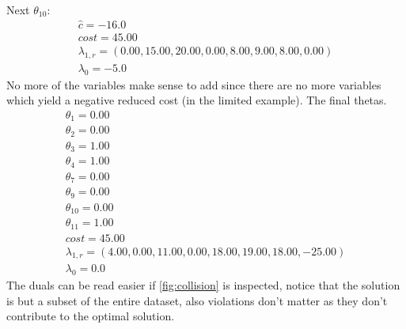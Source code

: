 \documentclass{article}
\begin{document}
    Next $\theta_{10}$:
    \begin{equation*}
        \begin{array}{c}
            \hat{c} = -16.0\\
            cost = 45.00\\
            \lambda_{1,r} = (0.00,15.00,20.00,0.00,8.00,9.00,8.00,0.00)\\
            \lambda_0 = -5.0
        \end{array}
    \end{equation*}
    No more of the variables make sense to add since there are no more variables which yield a negative reduced cost (in the limited example).
    The final thetas.
    \begin{equation*}
        \begin{array}{c}
            \theta_{1} = 0.00\\
            \theta_{2} = 0.00\\
            \theta_{3} = 1.00\\
            \theta_{4} = 1.00\\
            \theta_{7} = 0.00\\
            \theta_{9} = 0.00\\
            \theta_{10} = 0.00\\
            \theta_{11} = 1.00\\
            cost = 45.00\\
            \lambda_{1,r} = (4.00,0.00,11.00,0.00,18.00,19.00,18.00,-25.00)\\
            \lambda_0 = 0.0
        \end{array}
    \end{equation*}
    The duals can be read easier if \autoref{fig:collision} is inspected, notice that the solution is but a subset of the entire dataset, also violations don't matter as they don't contribute to the optimal solution.
\end{document}
